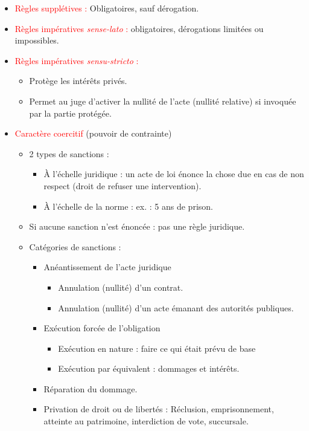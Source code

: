 \begin{itemize}
    \item \textcolor{red}{Règles supplétives :} Obligatoires, sauf dérogation.
    \item \textcolor{red}{Règles impératives \textit{sense-lato} :} obligatoires, dérogations limitées ou impossibles.
    \item \textcolor{red}{Règles impératives \textit{sensu-stricto} :}
    \begin{itemize}
        \item Protège les intérêts privés.
        \item Permet au juge d'activer la nullité de l'acte (nullité relative) si invoquée par la partie protégée.
    \end{itemize}
    \item \textcolor{red}{Caractère coercitif} (pouvoir de contrainte)
        \begin{itemize}
            \item 2 types de sanctions :
            \begin{itemize}
                \item À l'échelle juridique : un acte de loi énonce la chose due en cas de non respect (droit de refuser une intervention).
                \item À l'échelle de la norme : ex. : 5 ans de prison.
            \end{itemize}
            \item Si aucune sanction n'est énoncée : pas une règle juridique.
            \item Catégories de sanctions :
            \begin{itemize}
                \item Anéantissement de l'acte juridique
                \begin{itemize}
                    \item Annulation (nullité) d'un contrat.
                    \item Annulation (nullité) d'un acte émanant des autorités publiques.
                \end{itemize}
                \item Exécution forcée de l'obligation
                \begin{itemize}
                    \item Exécution en nature : faire ce qui était prévu de base
                    \item Exécution par équivalent : dommages et intérêts.
                \end{itemize}
                \item Réparation du dommage.
                \item Privation de droit ou de libertés : Réclusion, emprisonnement, atteinte au patrimoine, interdiction de vote, succursale.
            \end{itemize}
        \end{itemize}
\end{itemize}

